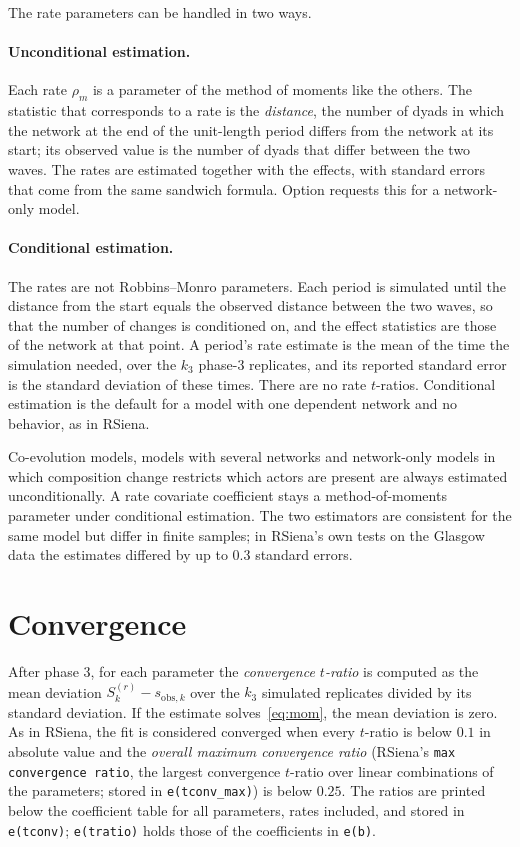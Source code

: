 The rate parameters can be handled in two ways.

\paragraph{Unconditional estimation.} Each rate $\rho_m$ is a parameter of the method of moments like the others. The statistic that corresponds to a rate is the \emph{distance}, the number of dyads in which the network at the end of the unit-length period differs from the network at its start; its observed value is the number of dyads that differ between the two waves. The rates are estimated together with the effects, with standard errors that come from the same sandwich formula. Option  requests this for a network-only model.

\paragraph{Conditional estimation.} The rates are not Robbins--Monro parameters. Each period is simulated until the distance from the start equals the observed distance between the two waves, so that the number of changes is conditioned on, and the effect statistics are those of the network at that point. A period's rate estimate is the mean of the time the simulation needed, over the $k_3$ phase-3 replicates, and its reported standard error is the standard deviation of these times. There are no rate $t$-ratios. Conditional estimation is the default for a model with one dependent network and no behavior, as in RSiena.

Co-evolution models, models with several networks and network-only models in which composition change restricts which actors are present are always estimated unconditionally. A rate covariate coefficient stays a method-of-moments parameter under conditional estimation. The two estimators are consistent for the same model but differ in finite samples; in RSiena's own tests on the Glasgow data the estimates differed by up to $0.3$ standard errors.

\section{Convergence}\label{sec:convergence}

After phase 3, for each parameter the \emph{convergence $t$-ratio} is computed as the mean deviation $S_k^{(r)}-s_{\mathrm{obs},k}$ over the $k_3$ simulated replicates divided by its standard deviation. If the estimate solves~\eqref{eq:mom}, the mean deviation is zero. As in RSiena, the fit is considered converged when every $t$-ratio is below $0.1$ in absolute value and the \emph{overall maximum convergence ratio} (RSiena's \texttt{max convergence ratio}, the largest convergence $t$-ratio over linear combinations of the parameters; stored in \texttt{e(tconv\_max)}) is below $0.25$. The ratios are printed below the coefficient table for all parameters, rates included, and stored in \texttt{e(tconv)}; \texttt{e(tratio)} holds those of the coefficients in \texttt{e(b)}.

